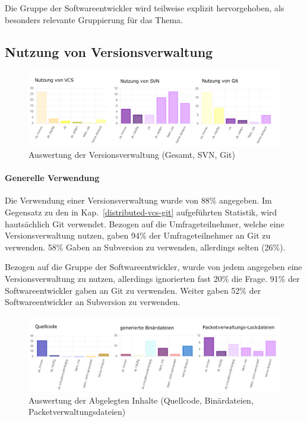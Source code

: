 Die Gruppe der Softwareentwickler wird teilweise explizit hervorgehoben, als besonders relevante Gruppierung für das Thema.

\subsection{Nutzung von Versionsverwaltung}

\begin{figure}[htbp]
  \includegraphics[width=\textwidth, height=\textheight, keepaspectratio]
    {resources/survey-vcs-usage.pdf}
  \caption{Auswertung der Versionsverwaltung (Gesamt, SVN, Git)}
\end{figure}

\paragraph{Generelle Verwendung}

Die Verwendung einer Versionsverwaltung wurde von 88\% angegeben. Im Gegensatz zu den in  Kap.~\ref{distributed-vcs-git} aufgeführten Statistik, wird hautsächlich Git verwendet. Bezogen auf die Umfrageteilnehmer, welche eine Versionsverwaltung nutzen, gaben 94\% der Umfrageteilnehmer an Git zu verwenden. 58\% Gaben an Subversion zu verwenden, allerdings selten (26\%). 

Bezogen auf die Gruppe der Softwareentwickler, wurde von jedem angegeben eine Versionsverwaltung zu nutzen, allerdings ignorierten fast 20\% die Frage. 91\% der Softwareentwickler gaben an Git zu verwenden. Weiter gaben 52\% der Softwareentwickler an Subversion zu verwenden.

\begin{figure}[htbp]
  \includegraphics[width=\textwidth, height=\textheight, keepaspectratio]
    {resources/survey-vcs-content.pdf}
  \caption{Auswertung der Abgelegten Inhalte (Quellcode, Binärdateien, Packetverwaltungsdateien)}
\end{figure}

